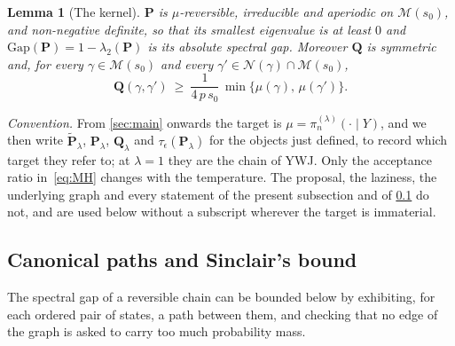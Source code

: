 \documentclass[aos]{imsart}
\theoremstyle{plain}
\newtheorem{lemma}{Lemma}[section]
\theoremstyle{definition}
\begin{document}
    \begin{lemma}[The kernel]
        \label{lemma:kernel}
        $\mathbf{P}$ is $\mu$-reversible, irreducible and aperiodic on
        $\mathscr{M}(s_0)$, and non-negative definite, so that its smallest
        eigenvalue is at least $0$ and
        $\mathrm{Gap}(\mathbf{P})=1-\lambda_2(\mathbf{P})$ is its absolute
        spectral gap. Moreover $\mathbf{Q}$ is symmetric and, for every
        $\gamma\in\mathscr{M}(s_0)$ and every
        $\gamma'\in\mathcal{N}(\gamma)\cap\mathscr{M}(s_0)$,
        \begin{equation}
            \label{eq:edge}
            \mathbf{Q}(\gamma,\gamma')\ \geq\ \frac{1}{4\,p\,s_0}\,
            \min\bigl\{\mu(\gamma),\,\mu(\gamma')\bigr\} .
        \end{equation}
    \end{lemma}

    \emph{Convention.} From \cref{sec:main} onwards the target is
    $\mu=\pi_n^{(\lambda)}(\cdot\mid Y)$, and we then write
    $\widetilde{\mathbf{P}}_\lambda$, $\mathbf{P}_\lambda$,
    $\mathbf{Q}_\lambda$ and $\tau_\epsilon(\mathbf{P}_\lambda)$ for the
    objects just defined, to record which target they refer to; at
    $\lambda=1$ they are the chain of YWJ. Only the acceptance ratio
    in~\eqref{eq:MH} changes with the temperature. The proposal, the
    laziness, the underlying graph and every statement of the present
    subsection and of \cref{sub:sinclair} do not, and are used below without
    a subscript wherever the target is immaterial.

    \subsection{Canonical paths and Sinclair's bound}
    \label{sub:sinclair}

    The spectral gap of a reversible chain can be bounded below by
    exhibiting, for each ordered pair of states, a path between them, and
    checking that no edge of the graph is asked to carry too much
    probability mass.
\end{document}

